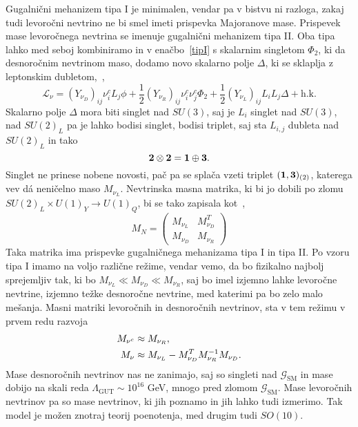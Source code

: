 Gugalnični mehanizem tipa I je minimalen, vendar pa v bistvu ni razloga, zakaj tudi levoročni
nevtrino ne bi smel imeti prispevka Majoranove mase. Prispevek mase levoročnega nevtrina se imenuje
gugalnični mehanizem tipa II. Oba tipa lahko med seboj kombiniramo in v enačbo~\eqref{tipI} s skalarnim
singletom $\Phi_2$, ki da desnoročnim nevtrinom maso, dodamo novo skalarno polje $\Delta$, ki se sklaplja
z leptonskim dubletom,~\cite{nugut},~\cite{strumia}
\begin{equation}
	\mathcal{L}_\nu = (Y_{\nu_D})_{ij} \nu^c_i L_j \phi +
		\frac{1}{2}(Y_{\nu_R})_{ij}\nu^c_i\nu^c_j\Phi_2 + \frac{1}{2}(Y_{\nu_L})_{ij}L_iL_j\Delta +
		\text{h.k.}
	\label{gugalnice}
\end{equation}
Skalarno polje $\Delta$ mora biti singlet nad $SU(3)$, saj je $L_i$ singlet nad $SU(3)$, nad
 $SU(2)_L$ pa
je lahko bodisi singlet, bodisi triplet, saj sta $L_{i,j}$ dubleta nad $SU(2)_L$ in tako
\begin{equation}
	\mathbf{2} \otimes \mathbf{2} = \mathbf{1}\oplus\mathbf{3}.
\end{equation}
Singlet ne prinese nobene novosti, pač pa se splača vzeti triplet $(\mathbf{1}, \mathbf{3})_{(2)}$, katerega vev
dá neničelno maso $M_{\nu_L}$. Nevtrinska masna matrika, ki bi jo dobili po zlomu
$SU(2)_L\times U(1)_Y \to U(1)_Q$, bi se tako zapisala kot~\cite{strumia},~\cite{miha}
\begin{equation}
	M_N = \begin{pmatrix}
		M_{\nu_L} & M_{\nu_D}^T \\
		M_{\nu_D} & M_{\nu_R}
	\end{pmatrix}
\end{equation}
Taka matrika ima prispevke gugalničnega mehanizama tipa I in tipa II. Po vzoru tipa I imamo na
voljo različne režime, vendar vemo, da bo fizikalno najbolj sprejemljiv tak, ki bo
$M_{\nu_L} \ll M_{\nu_D} \ll M_{\nu_R}$, saj bo imel izjemno lahke levoročne nevtrine,
izjemno težke desnoročne nevtrine, med katerimi pa bo zelo malo mešanja. Masni matriki
levoročnih in desnoročnih nevtrinov, sta v tem režimu v prvem redu razvoja~\cite{miha}
\begin{align}
	M_{\nu^c} &\approx M_{\nu_R}, \notag \\
	M_\nu &\approx M_{\nu_L} - M_{\nu_D}^T M_{\nu_R}^{-1} M_{\nu_D}.
\end{align}
Mase desnoročnih nevtrinov nas ne zanimajo, saj so singleti nad $\mathcal{G}_\text{SM}$ in mase dobijo
na skali reda $\Lambda_\text{GUT} \sim 10^{16}$ GeV, mnogo pred zlomom $\mathcal{G}_\text{SM}$. Mase
levoročnih nevtrinov pa so mase nevtrinov, ki jih poznamo in jih lahko tudi izmerimo. Tak model je možen
znotraj teorij poenotenja, med drugim tudi $SO(10)$.


